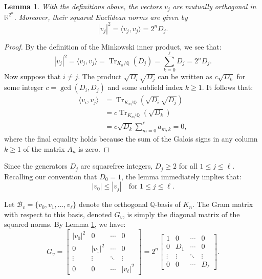 \documentclass{amsart}
\newcommand{\Q}{\mathbb{Q}}
\newcommand{\R}{\mathbb{R}}
\theoremstyle{plain}
\newtheorem{lemma}[theorem]{Lemma}
\theoremstyle{definition}
\theoremstyle{remark}
\numberwithin{equation}{section}
\begin{document}
\begin{lemma} \label{lem:orthogonal_radicals}
    With the definitions above, the vectors $v_j$ are mutually orthogonal in $\R^{2^n}$. Moreover, their squared Euclidean norms are given by
    \[
        |v_j|^2 = \langle v_j, v_j \rangle = 2^n D_j.
    \]
\end{lemma}



\begin{proof}
    By the definition of the Minkowski inner product, we see that:
    \[
        |v_j|^2 = \langle v_j, v_j \rangle = \operatorname{Tr}_{K_n/\Q}(D_j) = \sum_{k=0}^{\ell} D_j = 2^n D_j.
    \]
    Now suppose that $i \neq j$. The product $\sqrt{D_i}\sqrt{D_j}$ can be written as $c \sqrt{D_k}$ for some integer $c = \gcd(D_i, D_j)$ and some subfield index $k \ge 1$. It follows that:
    \begin{align*}
        \langle v_i, v_j \rangle &= \operatorname{Tr}_{K_n/\Q}(\sqrt{D_i}\sqrt{D_j}) \\
        &= c \operatorname{Tr}_{K_n/\Q}(\sqrt{D_k}) \\
        &= c \sqrt{D_k} \sum_{m=0}^{\ell} a_{m,k} = 0,
    \end{align*}
    where the final equality holds because the sum of the Galois signs in any column $k \ge 1$ of the matrix $A_n$ is zero.
\end{proof}

Since the generators $D_j$ are squarefree integers, $D_j \ge 2$ for all $1 \leq j \leq \ell$. Recalling our convention that $D_0 = 1$, the lemma immediately implies that:
\[ 
    |v_0| \leq |v_j| \quad \text{for } 1 \leq j \leq \ell.
\]

Let $\mathcal{B}_v = \{v_0, v_1, \ldots, v_\ell\}$ denote the orthogonal $\mathbb{Q}$-basis of $K_n$. The Gram matrix with respect to this basis, denoted $G_v$, is simply the diagonal matrix of the squared norms. By Lemma \ref{lem:orthogonal_radicals}, we have:
$$    G_v = \begin{bmatrix}
        |v_0|^2 & 0 & \cdots & 0 \\
        0 & |v_1|^2 & \cdots & 0 \\
        \vdots & \vdots & \ddots & \vdots \\
        0 & 0 & \cdots & |v_{\ell}|^2
    \end{bmatrix} 
    = 2^n \begin{bmatrix}
        1 & 0 & \cdots & 0 \\
        0 & D_1 & \cdots & 0 \\
        \vdots & \vdots & \ddots & \vdots \\
        0 & 0 & \cdots & D_{\ell}
    \end{bmatrix}.$$
\end{document}
